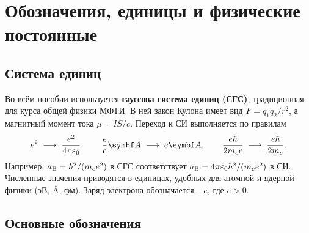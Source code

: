 \chapter*{Обозначения, единицы и физические постоянные}

\section*{Система единиц}\label{sec:units}

Во всём пособии используется \textbf{гауссова система единиц (СГС)}, традиционная для курса
общей физики МФТИ. В ней закон Кулона имеет вид $F=q_1q_2/r^2$, а магнитный момент тока
$\mu = IS/c$. Переход к СИ выполняется по правилам
\[
e^2 \;\longrightarrow\; \frac{e^2}{4\pi\varepsilon_0},\qquad
\frac{e}{c}\vect A \;\longrightarrow\; e\vect A,\qquad
\frac{e\hbar}{2\mel c}\;\longrightarrow\;\frac{e\hbar}{2\mel}.
\]
Например, $a_{\mathrm B}=\hbar^2/(m_e e^2)$ в СГС соответствует $a_{\mathrm B} = 4\pi\varepsilon_0\hbar^2/(m_e e^2)$ в СИ.
Численные значения приводятся в единицах, удобных для атомной и ядерной физики (эВ, Å, фм).
Заряд электрона обозначается $-e$, где $e>0$.

\section*{Основные обозначения}

